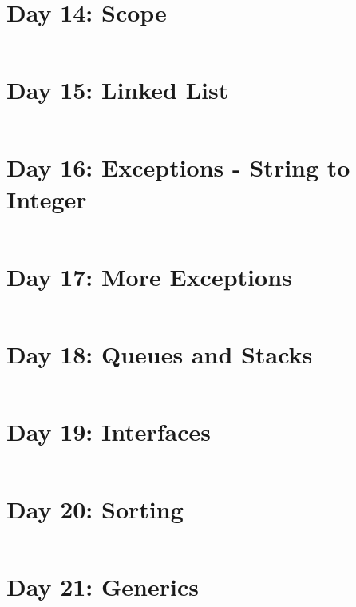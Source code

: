 \documentclass[11pt,a4paper]{article}
\begin{document}
\newpage
\section{Day 14: Scope}
\begin{lstlisting}
\end{lstlisting}

\newpage
\section{Day 15: Linked List}
\begin{lstlisting}
\end{lstlisting}

\newpage
\section{Day 16: Exceptions - String to Integer}
\begin{lstlisting}
\end{lstlisting}

\newpage
\section{Day 17: More Exceptions}
\begin{lstlisting}
\end{lstlisting}

\newpage
\section{Day 18: Queues and Stacks}
\begin{lstlisting}
\end{lstlisting}

\newpage
\section{Day 19: Interfaces}
\begin{lstlisting}
\end{lstlisting}

\newpage
\section{Day 20: Sorting}
\begin{lstlisting}
\end{lstlisting}

\newpage
\section{Day 21: Generics}
\begin{lstlisting}
\end{lstlisting}
\end{document}
